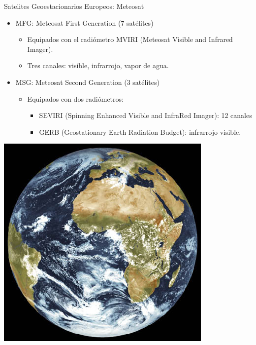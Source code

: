 \documentclass[xcolor={usenames,svgnames,dvipsnames}]{beamer}
\begin{document}
\begin{frame}[label={sec:orgb21961d}]{Satelites Geoestacionarios Europeos: Meteosat}
\begin{itemize}
\item \alert{MFG}: Meteosat First Generation (7 satélites)
\begin{itemize}
\item Equipados con el radiómetro MVIRI (Meteosat Visible and Infrared Imager).
\item Tres canales: visible, infrarrojo, vapor de agua.
\end{itemize}
\item \alert{MSG}: Meteosat Second Generation (3 satélites)
\begin{itemize}
\item Equipados con dos radiómetros:
\begin{itemize}
\item \alert{SEVIRI} (Spinning Enhanced Visible and InfraRed Imager): 12 canales
\item GERB (Geostationary Earth Radiation Budget): infrarrojo visible.
\end{itemize}
\end{itemize}
\end{itemize}

\begin{center}
\begin{center}
\includegraphics[height=0.3\textwidth]{../figs/Tierra_MSG.jpg}
\end{center}
\end{center}
\end{frame}
\end{document}
